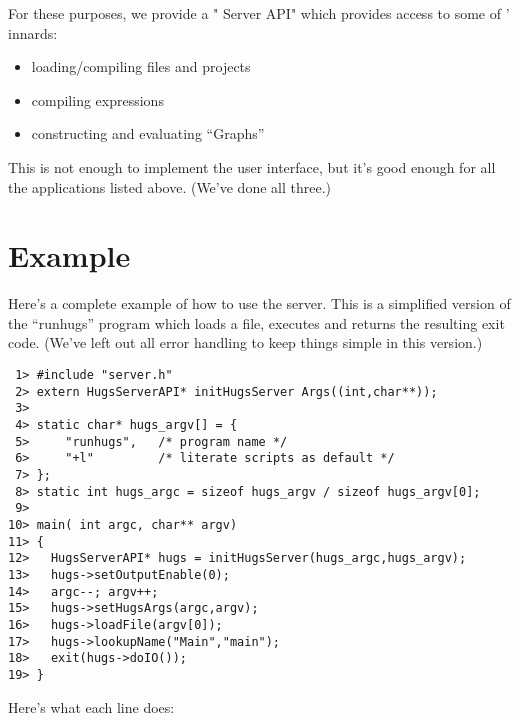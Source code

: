 For these purposes, we provide a "\Hugs{} Server API" which provides
access to some of \Hugs{}' innards:

\begin{itemize}
\item
 loading/compiling files and projects
\item
 compiling expressions
\item
 constructing and evaluating ``Graphs''
\end{itemize}

This is not enough to implement the \Hugs{} user interface, but it's good
enough for all the applications listed above.  (We've done all three.)


\section{Example}\label{example}

Here's a complete example of how to use the \Hugs{} server.  This 
is a simplified version of the ``runhugs'' program which loads a 
file, executes  and returns the resulting exit code.
(We've left out all error handling to keep things simple in this
version.)

\begin{verbatim}
 1> #include "server.h"
 2> extern HugsServerAPI* initHugsServer Args((int,char**));
 3> 
 4> static char* hugs_argv[] = {
 5> 	"runhugs",   /* program name */
 6> 	"+l"         /* literate scripts as default */
 7> };
 8> static int hugs_argc = sizeof hugs_argv / sizeof hugs_argv[0];
 9> 
10> main( int argc, char** argv) 
11> {  
12>   HugsServerAPI* hugs = initHugsServer(hugs_argc,hugs_argv);     
13>   hugs->setOutputEnable(0);                                      
14>   argc--; argv++;                                                
15>   hugs->setHugsArgs(argc,argv);                                  
16>   hugs->loadFile(argv[0]);                                       
17>   hugs->lookupName("Main","main");                               
18>   exit(hugs->doIO());
19> }             
\end{verbatim}  

Here's what each line does:

